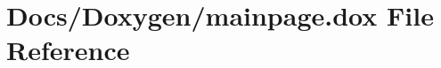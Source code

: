 \hypertarget{mainpage_8dox}{}\section{Docs/\+Doxygen/mainpage.dox File Reference}
\label{mainpage_8dox}
